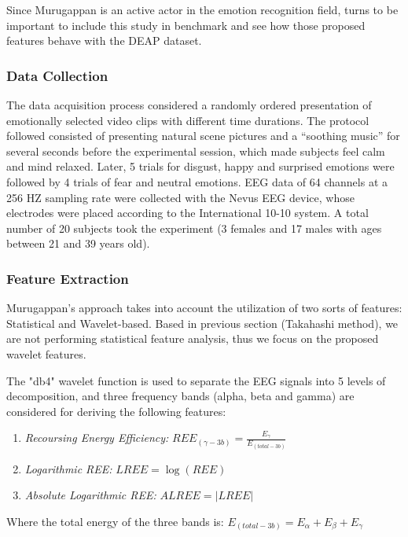 \documentclass{sig-alternate}
\begin{document}
Since Murugappan is an active actor in the emotion recognition field, turns to be important to include this study in benchmark and see how those proposed features behave with the DEAP dataset.

\subsubsection{Data Collection}

The data acquisition process considered a randomly ordered presentation of emotionally selected video clips with different time durations. The protocol followed consisted of presenting natural scene pictures and a ``soothing music'' for several seconds before the experimental session, which made subjects feel calm and mind relaxed. Later, 5 trials for disgust, happy and surprised emotions were followed by 4 trials of fear and neutral emotions. EEG data of 64 channels at a 256 HZ sampling rate were collected with the Nevus EEG device, whose electrodes were placed according to the International 10-10 system. A total number of 20 subjects took the experiment (3 females  and 17 males with ages between 21 and 39 years old).

\subsubsection{Feature Extraction}

Murugappan's approach takes into account the utilization of two sorts of features: Statistical and Wavelet-based. Based in previous section (Takahashi method), we are not performing statistical feature analysis, thus we focus on the proposed wavelet features.

The "db4" wavelet function is used to separate the EEG signals into 5 levels of decomposition, and three frequency bands (alpha, beta and gamma) are considered for deriving the following features:

\begin{enumerate}
\item \textit{Recoursing Energy Efficiency: } $REE_(\gamma-3b) = \frac{E_\gamma}{E_(total-3b)}$ 

\item \textit{Logarithmic REE: } $LREE = \log(REE)$
\item \textit{Absolute Logarithmic REE: } $ALREE = \mathopen|LREE\mathclose|$

\end{enumerate}

Where the total energy of the three bands is:
$E_(total-3b) = E_\alpha + E_\beta + E_\gamma$
\end{document}

